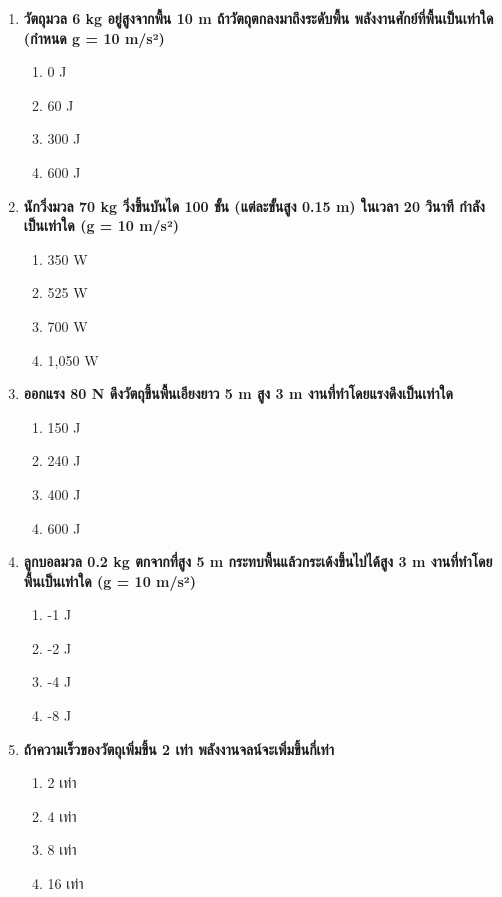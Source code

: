 \documentclass[12pt]{article}
\begin{document}
\begin{enumerate}
\begin{enumerate}[label=\alph*)]
\item 5 m/s
\item 10 m/s
\item 15 m/s
\item 20 m/s
\end{enumerate}
\item \textbf{วัตถุมวล 6 kg อยู่สูงจากพื้น 10 m ถ้าวัตถุตกลงมาถึงระดับพื้น พลังงานศักย์ที่พื้นเป็นเท่าใด (กำหนด g = 10 m/s²)}
\begin{enumerate}[label=\alph*)]
\item 0 J
\item 60 J
\item 300 J
\item 600 J
\end{enumerate}
\item \textbf{นักวิ่งมวล 70 kg วิ่งขึ้นบันได 100 ขั้น (แต่ละขั้นสูง 0.15 m) ในเวลา 20 วินาที กำลังเป็นเท่าใด (g = 10 m/s²)}
\begin{enumerate}[label=\alph*)]
\item 350 W
\item 525 W
\item 700 W
\item 1,050 W
\end{enumerate}
\item \textbf{ออกแรง 80 N ดึงวัตถุขึ้นพื้นเอียงยาว 5 m สูง 3 m งานที่ทำโดยแรงดึงเป็นเท่าใด}
\begin{enumerate}[label=\alph*)]
\item 150 J
\item 240 J
\item 400 J
\item 600 J
\end{enumerate}
\item \textbf{ลูกบอลมวล 0.2 kg ตกจากที่สูง 5 m กระทบพื้นแล้วกระเด้งขึ้นไปได้สูง 3 m งานที่ทำโดยพื้นเป็นเท่าใด (g = 10 m/s²)}
\begin{enumerate}[label=\alph*)]
\item -1 J
\item -2 J
\item -4 J
\item -8 J
\end{enumerate}
\item \textbf{ถ้าความเร็วของวัตถุเพิ่มขึ้น 2 เท่า พลังงานจลน์จะเพิ่มขึ้นกี่เท่า}
\begin{enumerate}[label=\alph*)]
\item 2 เท่า
\item 4 เท่า
\item 8 เท่า
\item 16 เท่า

\end{enumerate}
\end{enumerate}
\end{document}
